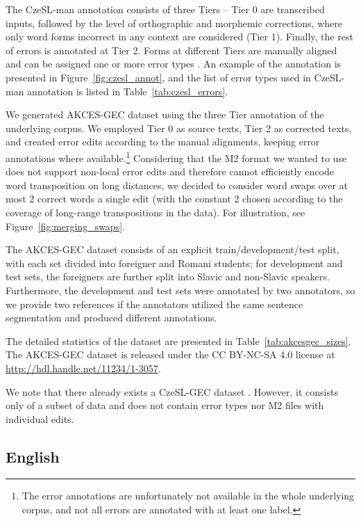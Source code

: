 \documentclass[11pt,a4paper]{article}
\begin{document}
The CzeSL-man annotation consists of three Tiers -- Tier 0 are transcribed inputs, followed by the level of orthographic and morphemic corrections, where only word forms incorrect in any context are considered (Tier 1). Finally, the rest of errors is annotated at Tier 2. Forms at different Tiers are manually aligned and can be assigned one or more error types \cite{CzeSL:TSD2012}. An example of the annotation is presented in Figure~\ref{fig:czesl_annot}, and the list of error types used in CzeSL-man annotation is listed in Table~\ref{tab:czesl_errors}.

We generated AKCES-GEC dataset using the three Tier annotation of the underlying corpus. We employed Tier 0 as source texts, Tier 2 as corrected texts, and created error edits according to the manual alignments, keeping error annotations where available.\footnote{The error annotations are unfortunately not available in the whole underlying corpus, and not all errors are annotated with at least one label.} Considering that the M2 format \cite{dahlmeier2012better} we wanted to use does not support non-local error edits and therefore cannot efficiently encode word transposition on long distances, we decided to consider word swaps over at most 2 correct words a single edit (with the constant 2 chosen according to the coverage of long-range transpositions in the data). For illustration, see Figure~\ref{fig:merging_swaps}.

The AKCES-GEC dataset consists of an explicit train/development/test split, with each set divided into foreigner and Romani students; for development and test sets, the foreigners are further split into Slavic and non-Slavic speakers. Furthermore, the development and test sets were annotated by two annotators, so we provide two references if the annotators utilized the same sentence segmentation and produced different annotations.

The detailed statistics of the dataset are presented in Table~\ref{tab:akcesgec_sizes}.
The AKCES-GEC dataset is released under the CC BY-NC-SA 4.0 license
at {\small\url{http://hdl.handle.net/11234/1-3057}}.

We note that there already exists a CzeSL-GEC dataset \cite{CzeSL_GEC_1}. However, it consists only of
a subset of data and does not contain error types nor M2 files with individual edits.

\subsection{English}
\end{document}
